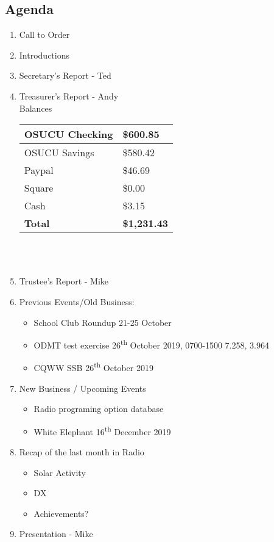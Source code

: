\documentclass[letter,11pt]{extarticle}
\begin{document}
	\subsection*{Agenda}
	\begin{enumerate}
		\item Call to Order
		\item Introductions
		\item Secretary's Report - Ted
		\item Treasurer's Report - Andy \\
				Balances 
			\begin{tabular}{|l|l|} \hline
				OSUCU Checking & \$600.85 \\ \hline
				OSUCU Savings & \$580.42 \\ \hline
				Paypal & \$46.69 \\ \hline
				Square & \$0.00 \\ \hline
				Cash & \$3.15 \\ \hline
				\textbf{Total} & \textbf{\$1,231.43} \\ \hline
			\end{tabular} \\ \\
		\item Trustee's Report - Mike
		\item Previous Events/Old Business:
		\begin{itemize}
				\item School Club Roundup 21-25 October
				\item ODMT test exercise 26\textsuperscript{th} October 2019, 0700-1500 7.258, 3.964	
				\item CQWW SSB 26\textsuperscript{th} October 2019
		\end{itemize}
			
		\item  New Business / Upcoming Events
			\begin{itemize}
				\item Radio programing option database
				\item White Elephant 16\textsuperscript{th} December 2019
			\end{itemize}
		\item Recap of the last month in Radio
			\begin{itemize}
				\item Solar Activity
				\item DX
				\item Achievements?
			\end{itemize}
		\item  Presentation - Mike

	\end{enumerate}
\end{document}
